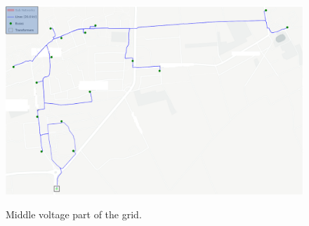 \begin{figure}[h]
	\begin{centering}
		{\includegraphics[scale=0.5]{figures/experiments/enwg_mv.png}}
		\caption{Middle voltage part of the grid.}
		\label{fig:enwg_mv}
	\end{centering}
\end{figure}
